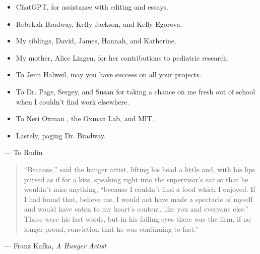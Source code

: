 \begin{titlepage}
\begin{itemize}
        \item ChatGPT, for assistance with editing and essays.
        \item Rebekah Bradway, Kelly Jackson, and Kelly Egorova.
        \item My siblings, David, James, Hannah, and Katherine.
        \item My mother, Alice Lingen, for her contributions to pediatric research.
        \item To Jenn Halweil, may you have success on all your projects.
        \item To Dr. Page, Sergey, and Susan for taking a chance on me fresh out of school when I couldn't find work elsewhere.
        \item To Neri Oxman \cite{oxman}, the Oxman Lab, and MIT.
        \item Lastely, paging Dr. Bradway.
    \end{itemize}
    \vfill

\hfill --- To Rudin

\begin{quote}
“Because,” said the hunger artist, lifting his head a little and, with his lips pursed as if for a kiss, speaking right into the supervisor’s ear so that he wouldn’t miss anything, “because I couldn’t find a food which I enjoyed. If I had found that, believe me, I would not have made a spectacle of myself and would have eaten to my heart’s content, like you and everyone else.” Those were his last words, but in his failing eyes there was the firm, if no longer proud, conviction that he was continuing to fast.”
\end{quote}

\hfill --- Franz Kafka, \textit{A Hunger Artist}

\end{titlepage}
